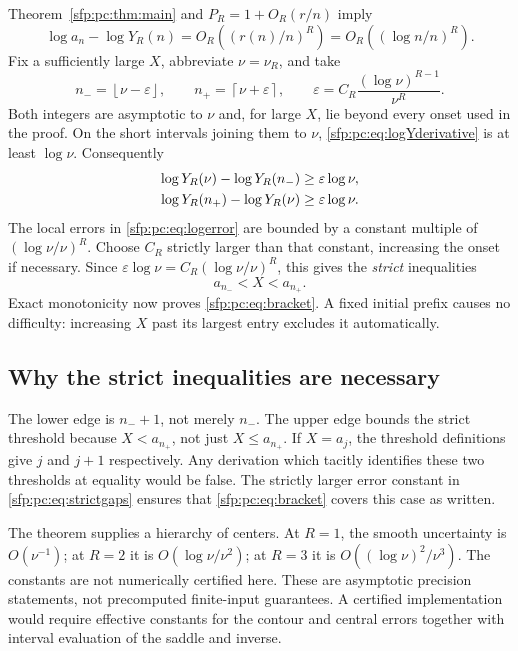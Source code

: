 \documentclass[11pt,letterpaper]{article}
\numberwithin{equation}{section}
\theoremstyle{definition}\newtheorem{definition}[theorem]{Definition}
\theoremstyle{remark}\newtheorem{remark}[theorem]{Remark}
\newcommand{\eps}{\varepsilon}
\newcommand{\ceil}[1]{\left\lceil #1\right\rceil}
\newcommand{\floor}[1]{\left\lfloor #1\right\rfloor}
\begin{document}
Theorem~\ref{sfp:pc:thm:main} and $P_R=1+O_R(r/n)$ imply
\begin{equation}\label{sfp:pc:eq:logerror}
 \log a_n-\log Y_R(n)
   =O_R\left((r(n)/n)^R\right)
   =O_R\left((\log n/n)^R\right).
\end{equation}
Fix a sufficiently large $X$, abbreviate $\nu=\nu_R$, and take
\begin{equation}\label{sfp:pc:eq:rounded}
 n_- =\floor{\nu-\eps},\qquad
 n_+ =\ceil{\nu+\eps},\qquad
 \eps=C_R\frac{(\log\nu)^{R-1}}{\nu^R}.
\end{equation}
Both integers are asymptotic to $\nu$ and, for large $X$, lie
beyond every onset used in the proof. On the short intervals
joining them to $\nu$, \eqref{sfp:pc:eq:logYderivative} is at least
$\log\nu$. Consequently
\begin{align}
 \log Y_R(\nu)-\log Y_R(n_-)&\geq\eps\log\nu,\notag\\
 \log Y_R(n_+)-\log Y_R(\nu)&\geq\eps\log\nu.
 \label{sfp:pc:eq:strictgaps}
\end{align}
The local errors in \eqref{sfp:pc:eq:logerror} are bounded by a constant
multiple of $(\log\nu/\nu)^R$. Choose $C_R$ strictly larger
than that constant, increasing the onset if necessary. Since
$\eps\log\nu=C_R(\log\nu/\nu)^R$, this gives the
\emph{strict} inequalities
\begin{equation}\label{sfp:pc:eq:strictendpoints}
 a_{n_-}<X<a_{n_+}.
\end{equation}
Exact monotonicity now proves \eqref{sfp:pc:eq:bracket}. A fixed initial
prefix causes no difficulty: increasing $X$ past its largest entry
excludes it automatically.

\subsection{Why the strict inequalities are necessary}

The lower edge is $n_-+1$, not merely $n_-$. The upper edge
bounds the strict threshold because $X<a_{n_+}$, not just
$X\leq a_{n_+}$. If $X=a_j$, the threshold definitions give
$j$ and $j+1$ respectively. Any derivation which tacitly identifies
these two thresholds at equality would be false. The strictly
larger error constant in \eqref{sfp:pc:eq:strictgaps} ensures that
\eqref{sfp:pc:eq:bracket} covers this case as written.

The theorem supplies a hierarchy of centers. At $R=1$, the
smooth uncertainty is $O(\nu^{-1})$; at $R=2$ it is
$O(\log\nu/\nu^2)$; at $R=3$ it is
$O((\log\nu)^2/\nu^3)$. The constants are not numerically
certified here. These are asymptotic precision statements, not
precomputed finite-input guarantees. A certified implementation
would require effective constants for the contour and central
errors together with interval evaluation of the saddle and inverse.
\end{document}
